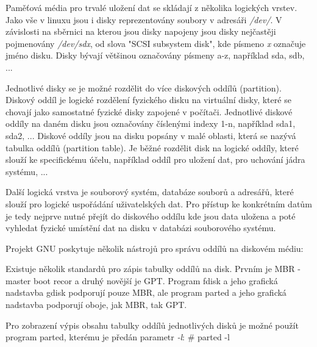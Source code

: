 

%








Paměťová média pro trvalé uložení dat se skládají z několika logických vrstev. Jako vše v linuxu jsou i disky reprezentovány soubory v adresáři {\it /dev/}. V závislosti na sběrnici na kterou jsou disky napojeny jsou disky nejčastěji pojmenovány {\it /dev/sdx}, od slova "SCSI subsystem disk", kde písmeno {\it x} označuje jméno disku. Disky bývají většinou označovány písmeny a-z, například sda, sdb, ... 

Jednotlivé disky se je možné rozdělit do více diskových oddílů (partition). Diskový oddíl je logické rozdělení fyzického disku na virtuální disky, které se chovají jako samostatné fyzické disky zapojené v počítači. Jednotlivé diskové oddíly na daném disku jsou označovány číslenými indexy 1-n, například sda1, sda2, ... Diskové oddíly jsou na disku popsány v malé oblasti, která se nazývá tabulka oddílů (partition table). Je běžné rozdělit disk na logické oddíly, které slouží ke specifickému účelu, například oddíl pro uložení dat, pro uchování jádra systému, ...

Další logická vrstva je souborový systém, databáze souborů a adresářů, které slouží pro logické uspořádání uživatelských dat. Pro přístup ke konkrétním datům je tedy nejprve nutné přejít do diskového oddílu kde jsou data uložena a poté vyhledat fyzické umístění dat na disku v databázi souborového systému.


Projekt GNU poskytuje několik nástrojů pro správu oddílů na diskovém médiu:

\vskip 4mm
\vskip 4mm

Existuje několik standardů pro zápis tabulky oddílů na disk. Prvním je MBR - master boot recor a druhý novější je GPT. Program fdisk a jeho grafická nadstavba gdisk podporují pouze MBR, ale program parted a jeho grafická nadstavba podporují oboje, jak MBR, tak GPT.

Pro zobrazení výpis obsahu tabulky oddílů jednotlivých disků je možné použít program parted, kterému je předán parametr {\it -l}:
\vskip 4mm
{\verbatim
# parted -l
}
\vskip 4mm

